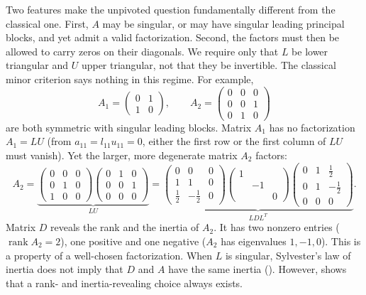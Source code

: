 \documentclass[preprint,12pt]{elsarticle}
\theoremstyle{plain}
\theoremstyle{nonumberplain}
\numberwithin{equation}{section}
\DeclareMathOperator{\rk}{rank}
\numberwithin{theorem}{section}
\begin{document}
Two features make the unpivoted question fundamentally different from the classical one.  First, $A$ may be singular, or may have singular leading principal blocks, and yet admit a valid factorization.  Second, the factors must then be allowed to carry zeros on their diagonals. We require only that $L$ be lower triangular and $U$ upper triangular, not that they be invertible.  The classical minor criterion says nothing in this regime. For example,
\begin{equation}\label{eq:swap-vs-exchange}
  A_1 =
  \begin{pmatrix}
    0 & 1\\
    1 & 0
  \end{pmatrix},
  \qquad
  A_2 =
  \begin{pmatrix}
    0 & 0 & 0\\
    0 & 0 & 1\\
    0 & 1 & 0
  \end{pmatrix}
\end{equation}
are both symmetric with singular leading blocks.  Matrix $A_1$ has no
factorization $A_1 = LU$ (from $a_{11}=l_{11}u_{11}=0$, either the first row or
the first column of $LU$ must vanish).  Yet the larger, more degenerate matrix
$A_2$ factors:
\begin{equation}\label{eq:exchange-factorizations}
  A_2 =
  \underbrace{
    \begin{pmatrix} 0 & 0 & 0\\ 0 & 1 & 0\\ 1 & 0 & 0
    \end{pmatrix}
    \begin{pmatrix} 0 & 1 & 0\\ 0 & 0 & 1\\ 0 & 0 & 0
  \end{pmatrix}}_{LU}
  =
  \underbrace{
    \begin{pmatrix} 0 & 0 & 0\\ 1 & 1 & 0\\ \tfrac12 & -\tfrac12 & 0
    \end{pmatrix}
    \begin{pmatrix} 1 & & \\ & -1 & \\ & & 0
    \end{pmatrix}
    \begin{pmatrix} 0 & 1 & \tfrac12\\ 0 & 1 & -\tfrac12\\ 0 & 0 & 0
  \end{pmatrix}}_{LDL^T} .
\end{equation}
Matrix $D$ reveals the rank and the inertia of $A_2$. It has two nonzero entries ($\rk A_2 = 2$), one positive and one negative ($A_2$ has eigenvalues $1, -1, 0$).  This is a property of a well-chosen factorization. When $L$ is singular, Sylvester's law of inertia does not imply that $D$ and $A$ have the same inertia (). However,  shows that a rank- and inertia-revealing choice always exists.
\end{document}
